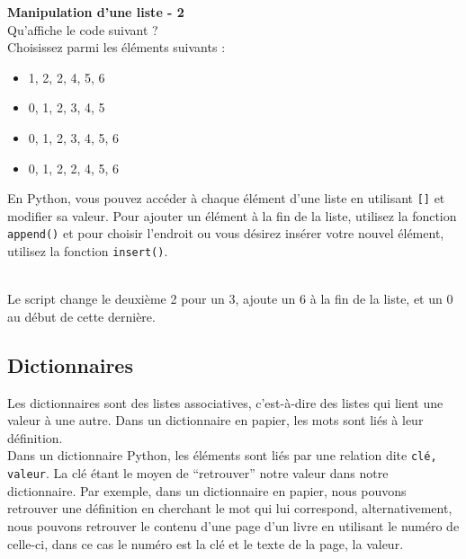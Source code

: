     \begin{Exercice}[5 minutes] \textbf{Manipulation d'une liste - 2}\\
       Qu'affiche le code suivant ? \\
       
        
       
       Choisissez parmi les éléments suivants :
       
       	\begin{itemize}
        \item 1, 2, 2, 4, 5, 6 \\
        \item 0, 1, 2, 3, 4, 5 \\
        \item 0, 1, 2, 3, 4, 5, 6 \\
        \item 0, 1, 2, 2, 4, 5, 6 \\
        \end{itemize}
    
        \begin{conseil}
            En Python, vous pouvez accéder à chaque élément d'une liste en utilisant \lstinline{[]} et modifier sa valeur. Pour ajouter un élément à la fin de la liste, utilisez la fonction \lstinline{append()} et pour choisir l'endroit ou vous désirez insérer votre nouvel élément, utilisez la fonction \lstinline{insert()}.
        \end{conseil}
        
        \begin{solution}
            [0, 1, 2, 3, 4, 5, 6] \\
            Le script change le deuxième 2 pour un 3, ajoute un 6 à la fin de la liste, et un 0 au début de cette dernière.
        \end{solution}
    \end{Exercice}


	\subsection{Dictionnaires}
	Les dictionnaires sont des listes associatives, c’est-à-dire des listes qui lient une valeur à une autre. Dans un dictionnaire en papier, les mots sont liés à leur définition. \\
	
	Dans un dictionnaire Python, les éléments sont liés par une relation dite \lstinline{clé, valeur}. La clé étant le moyen de “retrouver” notre valeur dans notre dictionnaire. Par exemple, dans un dictionnaire en papier, nous pouvons retrouver une définition en cherchant le mot qui lui correspond, alternativement, nous pouvons retrouver le contenu d’une page d’un livre en utilisant le numéro de celle-ci, dans ce cas le numéro est la clé et le texte de la page, la valeur. \\
	
